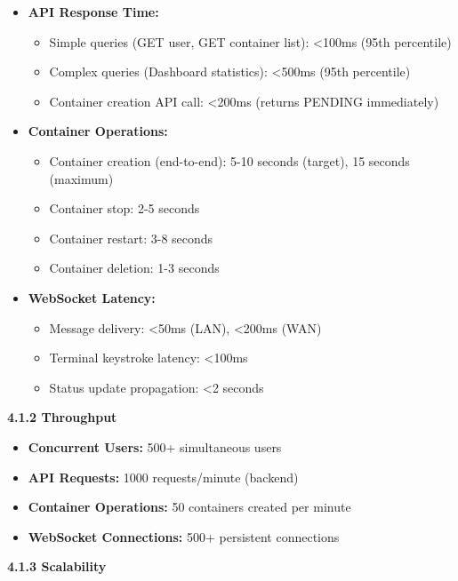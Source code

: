 \documentclass[12pt,a4paper]{article}
\begin{document}
\begin{itemize}[noitemsep]
    \item \textbf{API Response Time:}
    \begin{itemize}[noitemsep]
        \item Simple queries (GET user, GET container list): <100ms (95th percentile)
        \item Complex queries (Dashboard statistics): <500ms (95th percentile)
        \item Container creation API call: <200ms (returns PENDING immediately)
    \end{itemize}
    
    \item \textbf{Container Operations:}
    \begin{itemize}[noitemsep]
        \item Container creation (end-to-end): 5-10 seconds (target), 15 seconds (maximum)
        \item Container stop: 2-5 seconds
        \item Container restart: 3-8 seconds
        \item Container deletion: 1-3 seconds
    \end{itemize}
    
    \item \textbf{WebSocket Latency:}
    \begin{itemize}[noitemsep]
        \item Message delivery: <50ms (LAN), <200ms (WAN)
        \item Terminal keystroke latency: <100ms
        \item Status update propagation: <2 seconds
    \end{itemize}
\end{itemize}

\textbf{4.1.2 Throughput}

\begin{itemize}[noitemsep]
    \item \textbf{Concurrent Users:} 500+ simultaneous users
    \item \textbf{API Requests:} 1000 requests/minute (backend)
    \item \textbf{Container Operations:} 50 containers created per minute
    \item \textbf{WebSocket Connections:} 500+ persistent connections
\end{itemize}

\textbf{4.1.3 Scalability}
\end{document}
